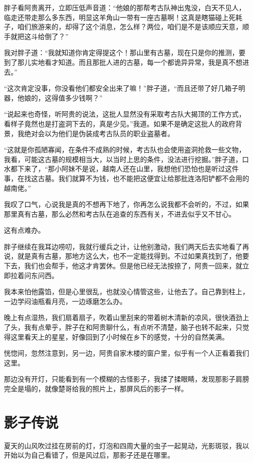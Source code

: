 胖子看阿贵离开，立即压低声音道：“他娘的那帮考古队神出鬼没，白天不见人，临走还带走那么多东西，明显这羊角山一带有一座古墓啊！这真是瞎猫碰上死耗子，咱们旅游来的，却得了这个消息，怎么样？两位，咱们是不是该顺应天意，顺手就把这斗给倒了？”

我对胖子道：“我就知道你肯定得提这个！那山里有古墓，现在只是你的推测，要到了那儿实地看才知道。而且那批人进的古墓，每一个都诡异异常，我是真不想进去。”

“这次肯定没事，你没看他们都安全出来了嘛！”胖子道，“而且还带了好几箱子明器，他娘的，这得值多少钱啊？”

“说起来也奇怪，听阿贵的说法，这批人显然没有采取考古队大揭顶的工作方式，看样子竟然也是打盗洞下去的，真是少见。”我道。如果不是确定这批人的政府背景，我绝对会以为他们是伪装成考古队员的职业盗墓者。

“这就是你孤陋寡闻，在条件不成熟的时候，考古队也会使用盗洞抢救一些文物，我看，可能这古墓的规模相当大，以当时上思的条件，没法进行挖掘。”胖子道，口水都下来了，“那小阿妹不是说，越南人还在山里，我想他们恐怕也是听过这件事，在找这古墓。我们就算不为钱，也不能把这便宜让给那批连洛阳铲都不会用的越南佬。”

我叹了口气，心说我是真的不想再下地了，你再怎么说我都不会听的，不过，如果那里真有古墓，那么必然和考古队在追查的东西有关，不进去似乎又不甘心。

这有点难办。

胖子继续在我耳边唠叨，我就行缓兵之计，让他别激动，我们两天后去实地看了再说，就是真有古墓，那地方这么大，也不一定能找得到。不过如果真找到了，他要下去，我们也会帮手，他这才肯罢休。但是他已经无法按捺了，阿贵一回来，就立即拉着问东问西。

我本来怕他露馅，但是心里很乱，也就没心情管这些，让他去了。自己靠到柱上，一边学闷油瓶看月亮，一边琢磨怎么办。

晚上有点湿热，我们扇着扇子，吹着山里刮来的带着树木清新的凉风，很快酒劲上了头，我有点晕乎，胖子在和阿贵聊什么，有点听不清楚，脑子也转不起来，只觉得这里看天上的星星，好像回到了小时候在乡下的感觉，十分的自然美满。

恍惚间，忽然注意到，另一边，阿贵自家木楼的窗户里，似乎有一个人正看着我们这里。

那边没有开灯，只能看到有一个模糊的古怪影子，我揉了揉眼睛，发现那影子肩膀完全是塌的，就像楚哥给我的照片上，那屏风后的影子一样。

\chapter{影子传说}

夏天的山风吹过挂在房前的灯，灯泡和四周大量的虫子一起晃动，光影斑驳，我以开始以为自己看错了，但是风过后，那影子还是在哪里。

